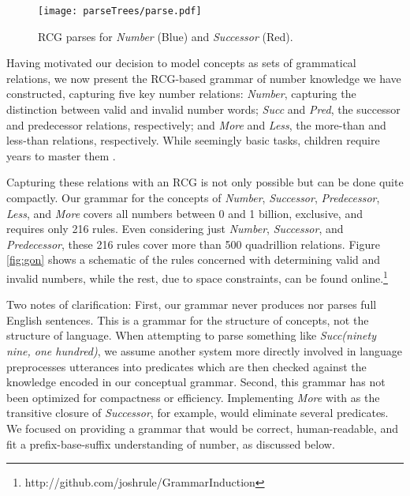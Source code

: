 \documentclass[10pt,letterpaper]{article}
\begin{document}
\begin{figure}[t]
  \begin{centering}
    \texttt{[image: parseTrees/parse.pdf]}
    \caption{RCG parses for \emph{Number} (Blue) and \emph{Successor} (Red).}
    \label{fig:parse}
  \end{centering}
\end{figure}

Having motivated our decision to model concepts as sets of grammatical
relations, we now present the RCG-based grammar of number knowledge we
have constructed, capturing five key number relations: \emph{Number},
capturing the distinction between valid and invalid number words;
\emph{Succ} and \emph{Pred}, the successor and predecessor relations,
respectively; and \emph{More} and \emph{Less}, the more-than and
less-than relations, respectively. While seemingly basic tasks,
children require years to master them \citep{FusRicBriar1982}.

Capturing these relations with an RCG is not only possible but can
be done quite compactly. Our grammar for the concepts of
\emph{Number}, \emph{Successor}, \emph{Predecessor}, \emph{Less}, and
\emph{More} covers all numbers between 0 and 1 billion, exclusive, and
requires only 216 rules. Even considering just \emph{Number},
\emph{Successor}, and \emph{Predecessor}, these 216 rules cover more
than 500 quadrillion relations. Figure \ref{fig:gon} shows a schematic
of the rules concerned with determining valid and invalid numbers,
while the rest, due to space constraints, can be found
online.\footnote{http://github.com/joshrule/GrammarInduction}

Two notes of clarification: First, our grammar never produces nor
parses full English sentences. This is a grammar for the structure of
concepts, not the structure of language. When attempting to parse
something like \emph{Succ(ninety nine, one hundred)}, we assume
another system more directly involved in language preprocesses
utterances into predicates which are then checked against the
knowledge encoded in our conceptual grammar. Second, this grammar has
not been optimized for compactness or efficiency. Implementing
\emph{More} with as the transitive closure of \emph{Successor}, for
example, would eliminate several predicates. We focused on providing a
grammar that would be correct, human-readable, and fit a
prefix-base-suffix understanding of number, as discussed below.
\end{document}
